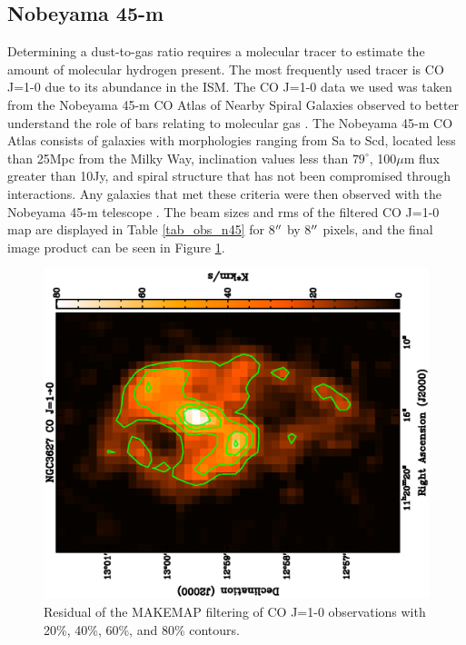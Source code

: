 
\subsection{Nobeyama 45-m}\label{nob_sec}

Determining a dust-to-gas ratio requires a molecular tracer to estimate the amount of molecular hydrogen present.  The most frequently used tracer is CO J=1-0 due to its abundance in the ISM.  The CO J=1-0 data we used was taken from the Nobeyama 45-m CO Atlas of Nearby Spiral Galaxies observed to better understand the role of bars relating to molecular gas \citep{kuno2007}.  The Nobeyama 45-m CO Atlas consists of galaxies with morphologies ranging from Sa to Scd, located less than 25Mpc from the Milky Way, inclination values less than $79^{\circ}$, 100$\mu$m flux greater than 10Jy, and spiral structure that has not been compromised through interactions.  Any galaxies that met these criteria were then observed with the Nobeyama 45-m telescope \citep{kuno2007}.  The beam sizes and rms of the filtered CO J=1-0 map are displayed in Table \ref{tab_obs_n45} for 8$\mbox{$^{\prime\prime}$}$ by 8$\mbox{$^{\prime\prime}$}$ pixels, and the final image product can be seen in Figure \ref{fig_co10}.

\begin{figure}
  \centering
  \includegraphics[width=1.\textwidth, angle=270]{obs_imgs/10_rem.eps}
  \caption[NGC3627 CO J=1-0 Observations]{Residual of the MAKEMAP filtering of CO J=1-0 observations with 20\%, 40\%, 60\%, and 80\% contours.}
  \label{fig_co10}
\end{figure}

